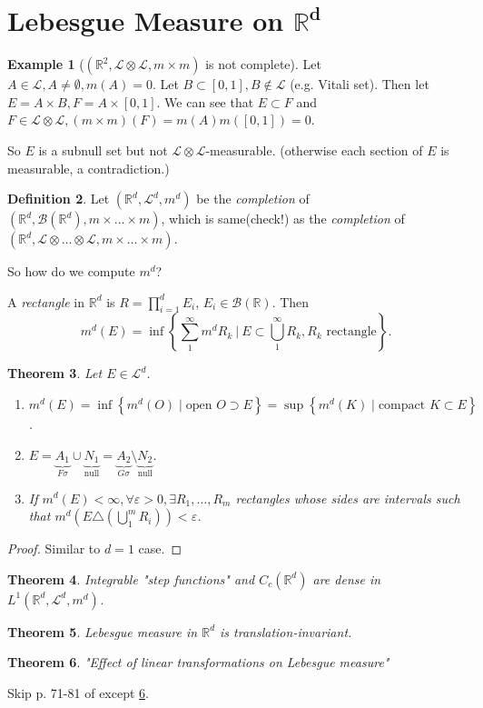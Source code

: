 \documentclass{report}
\newcommand{\R}{\mathbb{R}}
\newcommand{\cB}{\mathcal{B}}
\newcommand{\cL}{\mathcal{L}}
\newtheorem{theorem}{Theorem}[chapter]
\theoremstyle{definition}
\newtheorem{definition}[theorem]{Definition}
\newtheorem{example}[theorem]{Example}
\theoremstyle{remark}
\newcommand*\ttlmath[2]{\texorpdfstring{$\boldsymbol{#1}$}{#2}}
\begin{document}
\section{Lebesgue Measure on \ttlmath{\R^d}{R-d}}
\begin{example}[$(\R^2, \cL \otimes \cL, m \times m)$ is not complete]
	Let $A \in \cL, A \neq \emptyset, m(A) = 0$. Let $B \subset [0, 1], B \notin \cL$ (e.g. Vitali set). Then let $E = A \times B, F = A \times [0, 1]$. We can see that $E \subset F$ and $F \in \cL \otimes \cL, (m \times m)(F) = m(A)m([0, 1]) = 0$. 
	
	So $E$ is a subnull set but not $\cL \otimes \cL$-measurable. (otherwise each section of $E$ is measurable, a contradiction.)
\end{example}
\begin{definition}
	Let $(\R^d, \cL^d, m^d)$ be the \emph{completion} of $(\R^d, \cB(\R^d), m \times \ldots \times m)$, which is same(check!) as the \emph{completion} of $(\R^d, \cL \otimes \ldots \otimes \cL, m \times \ldots \times m)$.
\end{definition}
So how do we compute $m^d$?

A \emph{rectangle} in $\R^d$ is $\displaystyle R = \prod_{i=1}^d E_i$, $E_i \in \cB(\R)$. Then 
\[
	m^d(E) = \inf \left\lbrace \sum_1^\infty m^d{R_k}\ \biggr\rvert\ E \subset \bigcup_1^\infty R_k, R_k \text{ rectangle}\right\rbrace.
\]

\begin{theorem}
	Let $E \in \cL^d$.
	\begin{enumerate}
		\item $m^d(E) = \inf\left\lbrace m^d(O) \mid \text{open } O \supset E\right\rbrace = \sup \left\lbrace m^d(K) \mid \text{compact } K \subset E \right\rbrace$.
		\item $E = \underbrace{A_1}_{F\sigma} \cup \underbrace{N_1}_{\text{null}} = \underbrace{A_2}_{G\sigma} \setminus \underbrace{N_2}_{\text{null}}$.
		\item If $m^d(E) < \infty, \forall \varepsilon > 0, \exists R_1, \ldots, R_m$ rectangles whose sides are \emph{intervals} such that $\displaystyle m^d \left(E \triangle \left(\bigcup_1^m R_i\right)\right) < \varepsilon$.
	\end{enumerate}
\end{theorem}
\begin{proof}
	Similar to $d=1$ case.
\end{proof}

\begin{theorem}
	Integrable "step functions" and $C_c(\R^d)$ are dense in $L^1(\R^d, \cL^d, m^d)$.
\end{theorem}
\begin{theorem}
	Lebesgue measure in $\R^d$ is translation-invariant.
\end{theorem}
\begin{theorem}\label{thm:GLonmeasure}
	"Effect of linear transformations on Lebesgue measure"
\end{theorem}
Skip p. 71-81 of \cite{follandRealAnalysisModern1999} except \ref{thm:GLonmeasure}.
\end{document}
